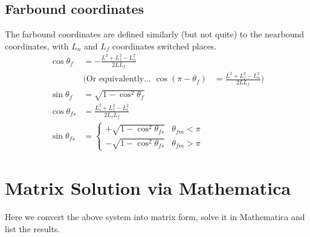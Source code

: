 \documentclass[11pt,twocolumn]{article}
\begin{document}
\subsection{Farbound coordinates}
The farbound coordinates are defined similarly (but not quite) to the nearbound coordinates, with
$L_n$ and $L_f$ coordinates switched places.
\begin{align}
  \cos\theta_f &= -\frac{L^2 + L_f^2 - L_n^2}{2L L_f}\\
  &\Bigg( \mbox{Or equivalently...   }
  \cos\left(\pi - \theta_f\right) &= \frac{L^2 + L_f^2 - L_n^2}{2L L_f}\Bigg)\\
  \sin\theta_{f} &= \sqrt{1 - \cos^2\theta_{f}} \\
  \cos\theta_{fs} &= \frac{L_s^2 + L_f^2 - L_t^2}{2L_s L_f} \\
  \sin\theta_{fs} &=
  \begin{cases}
    +\sqrt{1 - \cos^2\theta_{fs}} & \theta_{fm} < \pi \\
    -\sqrt{1 - \cos^2\theta_{fs}} & \theta_{fm} > \pi
  \end{cases}
\end{align}

\onecolumn

\section{Matrix Solution via Mathematica}
Here we convert the above system into matrix form, solve it in Mathematica and list the results.
\end{document}
